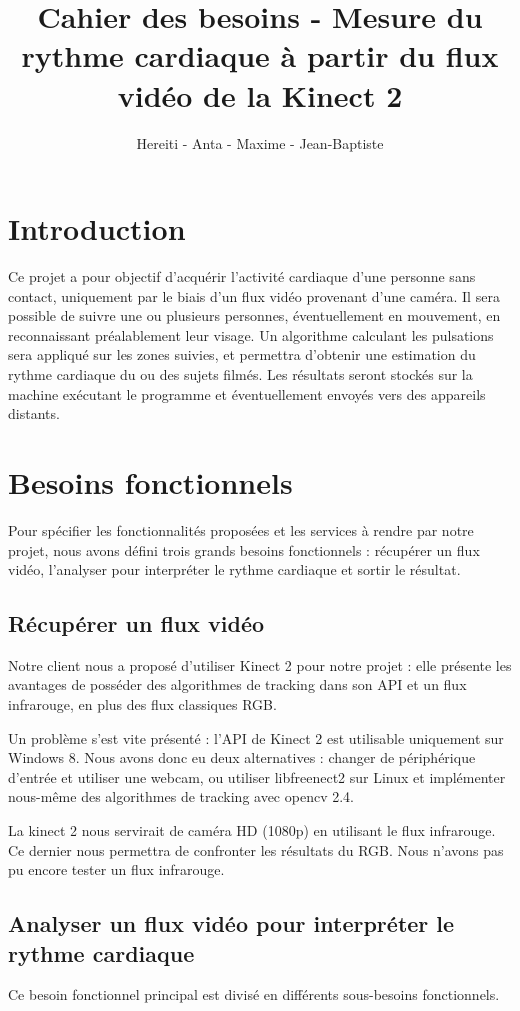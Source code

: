 \documentclass[12pt,a4paper]{article}
\title{Cahier des besoins - Mesure du rythme cardiaque à partir du flux vidéo de la Kinect 2}
\author{Hereiti \bsc{Hatitio} - Anta \bsc{Mbaye} - Maxime \bsc{Vincent} - Jean-Baptiste \bsc{Rey}}
\begin{document}
\maketitle

\tableofcontents
\newpage

\section*{Introduction}

Ce projet a pour objectif d'acquérir l'activité cardiaque d'une personne sans contact, uniquement par le biais d'un flux vidéo provenant d'une caméra.
Il sera possible de suivre une ou plusieurs personnes, éventuellement en mouvement, en reconnaissant préalablement leur visage. Un algorithme calculant les pulsations sera appliqué sur les zones suivies, et permettra d'obtenir une estimation du rythme cardiaque du ou des sujets filmés. Les résultats seront stockés sur la machine exécutant le programme et éventuellement envoyés vers des appareils distants.  

\section{Besoins fonctionnels}
Pour spécifier les fonctionnalités proposées et les services à rendre par notre projet, nous avons défini trois grands besoins fonctionnels : récupérer un flux vidéo, l'analyser pour interpréter le rythme cardiaque et sortir le résultat.

\subsection{Récupérer un flux vidéo}
Notre client nous a proposé d'utiliser Kinect 2 pour notre projet : elle présente les avantages de posséder des algorithmes de tracking dans son API et un flux infrarouge, en plus des flux classiques RGB.

Un problème s'est vite présenté : l'API de Kinect 2 est utilisable uniquement sur Windows 8. Nous avons donc eu deux alternatives : changer de périphérique d'entrée et utiliser une webcam, ou utiliser libfreenect2 sur Linux et implémenter nous-même des algorithmes de tracking avec opencv 2.4.

La kinect 2 nous servirait de caméra HD (1080p) en utilisant le flux infrarouge. Ce dernier nous permettra de confronter les résultats du RGB. Nous n'avons pas pu encore tester un flux infrarouge.

\subsection{Analyser un flux vidéo pour interpréter le rythme cardiaque}
Ce besoin fonctionnel principal est divisé en différents sous-besoins fonctionnels.
\end{document}

